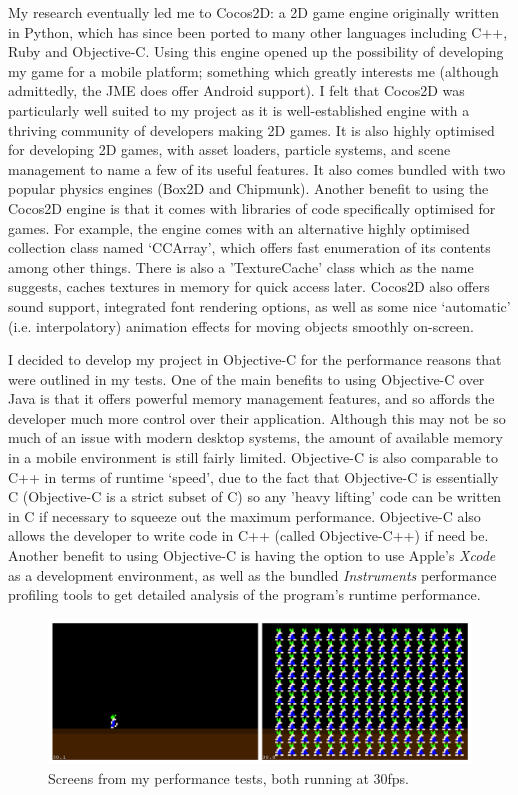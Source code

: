 \documentclass[a4paper,oneside]{report}
\begin{document}
My research eventually led me to Cocos2D: a 2D game engine originally written in Python, which has since been ported to many other languages including C++, Ruby and Objective-C. Using this engine opened up the possibility of developing my game for a mobile platform; something which greatly interests me (although admittedly, the JME does offer Android support). I felt that Cocos2D was particularly well suited to my project as it is well-established engine with a thriving community of developers making 2D games. It is also highly optimised for developing 2D games, with asset loaders, particle systems, and scene management to name a few of its useful features. It also comes bundled with two popular physics engines (Box2D and Chipmunk). Another benefit to using the Cocos2D engine is that it comes with libraries of code specifically optimised for games. For example, the engine comes with an alternative highly optimised collection class named `CCArray', which offers fast enumeration of its contents among other things. There is also a 'TextureCache' class which as the name suggests, caches textures in memory for quick access later. Cocos2D also offers sound support, integrated font rendering options, as well as some nice `automatic' (i.e. interpolatory) animation effects for moving objects smoothly on-screen. 

I decided to develop my project in Objective-C for the performance reasons that were outlined in my tests. One of the main benefits to using Objective-C over Java is that it offers powerful memory management features, and so affords the developer much more control over their application. Although this may not be so much of an issue with modern desktop systems, the amount of available memory in a mobile environment is still fairly limited. Objective-C is also comparable to C++ in terms of runtime `speed', due to the fact that Objective-C is essentially C (Objective-C is a strict subset of C) so any 'heavy lifting' code can be written in C if necessary to squeeze out the maximum performance. Objective-C also allows the developer to write code in C++ (called Objective-C++) if need be. Another benefit to using Objective-C is having the option to use Apple's \emph{Xcode} as a development environment, as well as the bundled \emph{Instruments} performance profiling tools to get detailed analysis of the program's runtime performance.

\begin{figure}[h!]
  \centering
    \includegraphics[width=140mm]{sources/images/InitialTests}
    \caption{Screens from my performance tests, both running at 30fps.}
    \label{fig:PerformanceTest}
\end{figure}
\end{document}
